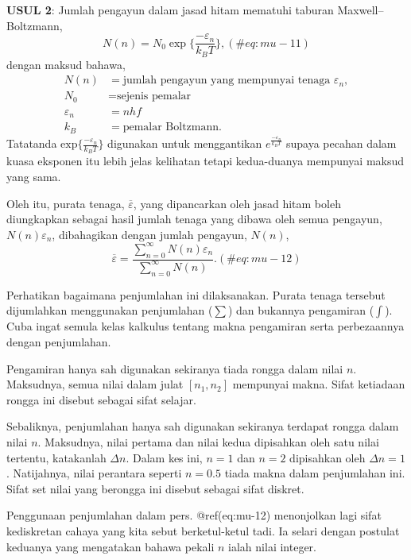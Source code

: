 \documentclass[
]{book}
\begin{document}
\textbf{USUL 2}: Jumlah pengayun dalam jasad hitam mematuhi taburan
Maxwell--Boltzmann, \begin{equation}
N(n)= N_0\exp\Big\{\frac{-\varepsilon_n}{k_BT}\Big\},
(\#eq:mu-11)
\end{equation} dengan maksud bahawa, \begin{equation*}
\begin{split}
N(n) &= \text{jumlah pengayun yang mempunyai tenaga $\varepsilon_n$},\\
N_0 &= \text{sejenis pemalar}\\
\varepsilon_n &= nhf\\
k_B &= \text{pemalar Boltzmann}.
\end{split}
\end{equation*} Tatatanda
\(\text{exp}\Big\{\frac{-\varepsilon_n}{k_BT}\Big\}\) digunakan untuk
menggantikan \(e^{\frac{-\varepsilon_n}{k_BT}}\) supaya pecahan dalam
kuasa eksponen itu lebih jelas kelihatan tetapi kedua-duanya mempunyai
maksud yang sama.

Oleh itu, purata tenaga, \(\overline{\varepsilon}\), yang dipancarkan
oleh jasad hitam boleh diungkapkan sebagai hasil jumlah tenaga yang
dibawa oleh semua pengayun, \(N(n)\varepsilon_n\), dibahagikan dengan
jumlah pengayun, \(N(n)\), \begin{equation}
\overline{\varepsilon} = \frac{\sum_{n=0}^{\infty}N(n)\varepsilon_n}{\sum_{n=0}^{\infty}N(n)}.
(\#eq:mu-12)
\end{equation}

Perhatikan bagaimana penjumlahan ini dilaksanakan. Purata tenaga
tersebut dijumlahkan menggunakan penjumlahan (\(\sum\)) dan bukannya
pengamiran (\(\int\)). Cuba ingat semula kelas kalkulus tentang makna
pengamiran serta perbezaannya dengan penjumlahan.

Pengamiran hanya sah digunakan sekiranya tiada rongga dalam nilai \(n\).
Maksudnya, semua nilai dalam julat \([n_1, n_2]\) mempunyai makna. Sifat
ketiadaan rongga ini disebut sebagai sifat selajar.

Sebaliknya, penjumlahan hanya sah digunakan sekiranya terdapat rongga
dalam nilai \(n\). Maksudnya, nilai pertama dan nilai kedua dipisahkan
oleh satu nilai tertentu, katakanlah \(\Delta n\). Dalam kes ini,
\(n=1\) dan \(n=2\) dipisahkan oleh \(\Delta n = 1\). Natijahnya, nilai
perantara seperti \(n=0.5\) tiada makna dalam penjumlahan ini. Sifat set
nilai yang berongga ini disebut sebagai sifat diskret.

Penggunaan penjumlahan dalam pers. @ref(eq:mu-12) menonjolkan lagi sifat
kediskretan cahaya yang kita sebut berketul-ketul tadi. Ia selari dengan
postulat keduanya yang mengatakan bahawa pekali \(n\) ialah nilai
integer.
\end{document}
